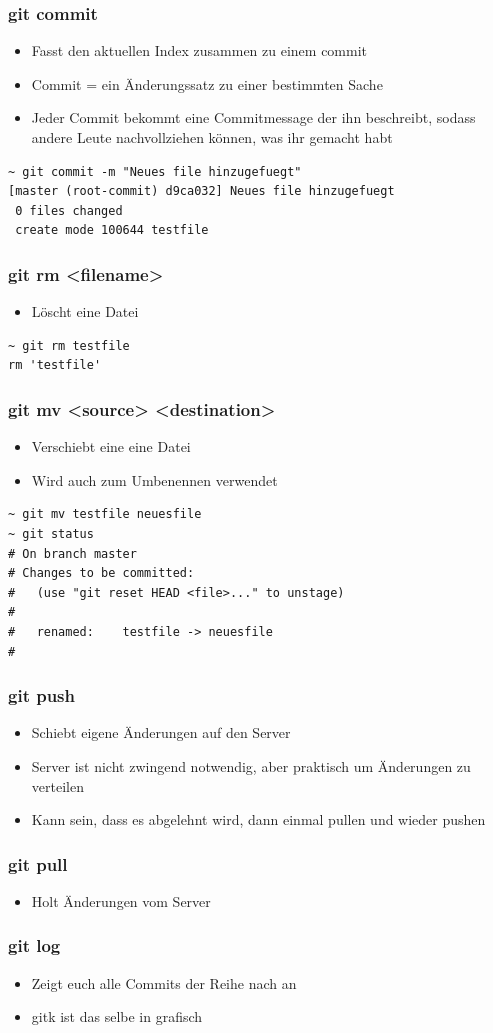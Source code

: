 \documentclass[ngerman,compress]{beamer}
\begin{document}
\begin{frame} [fragile]
	\frametitle{git commit}
	\begin{itemize}
		\item Fasst den aktuellen Index zusammen zu einem commit
		\item Commit = ein Änderungssatz zu einer bestimmten Sache
		\item Jeder Commit bekommt eine Commitmessage der ihn beschreibt, sodass andere Leute nachvollziehen können, was ihr gemacht habt
	\end{itemize}
	\begin{lstlisting}
~ git commit -m "Neues file hinzugefuegt"
[master (root-commit) d9ca032] Neues file hinzugefuegt
 0 files changed
 create mode 100644 testfile
	\end{lstlisting}
\end{frame}

\begin{frame} [fragile]
	\frametitle{git rm <filename>}
	\begin{itemize}
		\item Löscht eine Datei
	\end{itemize}
	\begin{lstlisting}
~ git rm testfile 
rm 'testfile'
	\end{lstlisting}
\end{frame}

\begin{frame} [fragile]
	\frametitle{git mv <source> <destination>}
	\begin{itemize}
		\item Verschiebt eine eine Datei
		\item Wird auch zum Umbenennen verwendet
	\end{itemize}
	\begin{lstlisting}
~ git mv testfile neuesfile
~ git status
# On branch master
# Changes to be committed:
#   (use "git reset HEAD <file>..." to unstage)
#
#	renamed:    testfile -> neuesfile
#
	\end{lstlisting}
\end{frame}

\begin{frame}
	\frametitle{git push}
	\begin{itemize}
		\item Schiebt eigene Änderungen auf den Server
		\item Server ist nicht zwingend notwendig, aber praktisch um Änderungen zu verteilen
		\item Kann sein, dass es abgelehnt wird, dann einmal pullen und wieder pushen
	\end{itemize}
\end{frame}

\begin{frame}
	\frametitle{git pull}
	\begin{itemize}
		\item Holt Änderungen vom Server
	\end{itemize}
\end{frame}

\begin{frame}
	\frametitle{git log}
	\begin{itemize}
		\item Zeigt euch alle Commits der Reihe nach an
		\item gitk ist das selbe in grafisch
	\end{itemize}
\end{frame}
\end{document}
